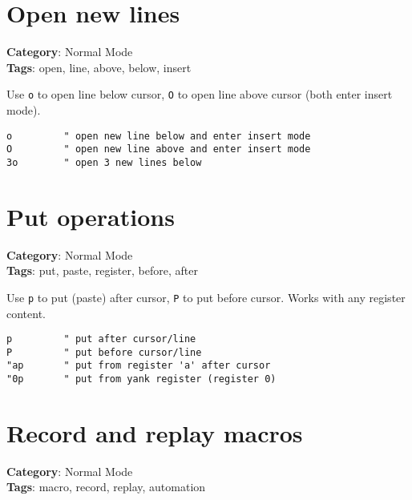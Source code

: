 {{{{{{{{{\section{Open new lines}

\textbf{Category}: Normal Mode\\ \textbf{Tags}: open, line, above, below, insert
\vspace{0.5cm}

Use {\footnotesize \Verb§o§} to open line below cursor, {\footnotesize \Verb§O§} to open line above cursor (both enter insert mode).

\begin{Exa*}{}
\begin{Verbatim}[fontsize=\footnotesize, breaklines, breakanywhere]
o         " open new line below and enter insert mode
O         " open new line above and enter insert mode
3o        " open 3 new lines below
\end{Verbatim}
\end{Exa*}

\section{Put operations}

\textbf{Category}: Normal Mode\\ \textbf{Tags}: put, paste, register, before, after
\vspace{0.5cm}

Use {\footnotesize \Verb§p§} to put (paste) after cursor, {\footnotesize \Verb§P§} to put before cursor. Works with any register content.

\begin{Exa*}{}
\begin{Verbatim}[fontsize=\footnotesize, breaklines, breakanywhere]
p         " put after cursor/line
P         " put before cursor/line
"ap       " put from register 'a' after cursor
"0p       " put from yank register (register 0)
\end{Verbatim}
\end{Exa*}

\section{Record and replay macros}

\textbf{Category}: Normal Mode\\ \textbf{Tags}: macro, record, replay, automation
\vspace{0.5cm}

}}}}}}}}}
